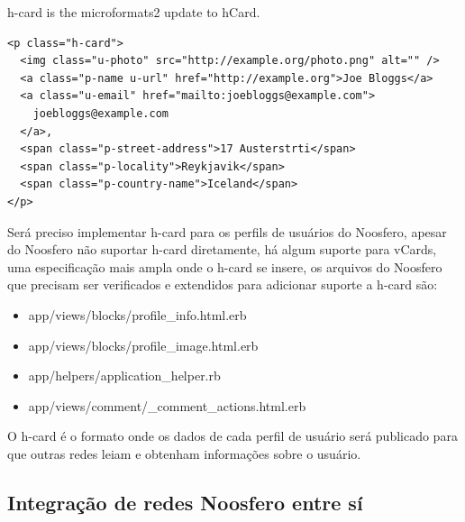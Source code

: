 \documentclass[12pt]{article}
\begin{document}
h-card is the microformats2 update to hCard.

\begin{framed}
\begin{lstlisting}[caption=Exemplo de h-card]
<p class="h-card">
  <img class="u-photo" src="http://example.org/photo.png" alt="" />
  <a class="p-name u-url" href="http://example.org">Joe Bloggs</a>
  <a class="u-email" href="mailto:joebloggs@example.com">
    joebloggs@example.com
  </a>, 
  <span class="p-street-address">17 Austerstrti</span>
  <span class="p-locality">Reykjavik</span>
  <span class="p-country-name">Iceland</span>
</p>
\end{lstlisting}
\end{framed}

Será preciso implementar h-card para os perfils de usuários do Noosfero,
apesar do Noosfero não suportar h-card diretamente, há algum suporte para
vCards, uma especificação mais ampla onde o h-card se insere, os arquivos do
Noosfero que precisam ser verificados e extendidos para adicionar suporte a
h-card são:

\begin{itemize}
  \item app/views/blocks/profile\_info.html.erb
  \item app/views/blocks/profile\_image.html.erb
  \item app/helpers/application\_helper.rb
  \item app/views/comment/\_comment\_actions.html.erb
\end{itemize}

O h-card é o formato onde os dados de cada perfil de usuário será publicado
para que outras redes leiam e obtenham informações sobre o usuário.

\subsection{Integração de redes Noosfero entre sí}

\end{document}
